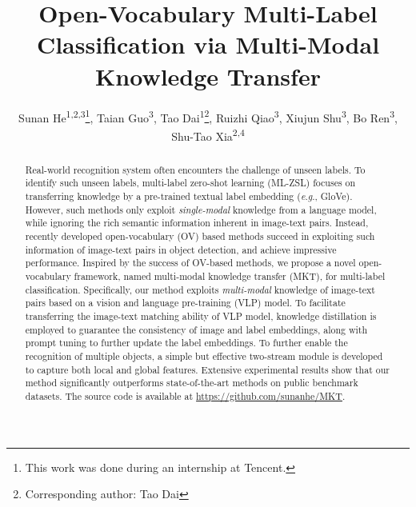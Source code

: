 \documentclass[letterpaper]{article} \usepackage{aaai23}  \usepackage{times}  \usepackage{helvet}  \usepackage{courier}  \usepackage[hyphens]{url}  \usepackage{graphicx} \urlstyle{rm} \def\UrlFont{\rm}  \usepackage{natbib}  \usepackage{caption} \frenchspacing  \setlength{\pdfpagewidth}{8.5in}  \setlength{\pdfpageheight}{11in}
\title{Open-Vocabulary Multi-Label Classification via Multi-Modal Knowledge Transfer}
\author{
Sunan He\textsuperscript{\rm 1,2,3}\equalcontrib\thanks{This work was done during an internship at Tencent.},
    Taian Guo\textsuperscript{\rm 3}\equalcontrib, 
    Tao Dai\textsuperscript{\rm 1}\thanks{Corresponding author: Tao Dai},
    Ruizhi Qiao\textsuperscript{\rm 3},
    Xiujun Shu\textsuperscript{\rm 3},
    Bo Ren\textsuperscript{\rm 3},
    Shu-Tao Xia\textsuperscript{\rm 2,4}
}
\newcommand{\eg}{\textit{e}.\textit{g}.}
\begin{document}
\maketitle

\begin{abstract}
Real-world recognition system often encounters the challenge of unseen labels.
To identify such unseen labels, multi-label zero-shot learning (ML-ZSL) focuses on transferring knowledge by a pre-trained textual label embedding (\eg, GloVe).
However, such methods only exploit \textit{single-modal} knowledge from a language model, while ignoring the rich semantic information inherent in image-text pairs.
Instead, recently developed open-vocabulary (OV) based methods  succeed in exploiting such information of image-text pairs  in  object detection, and achieve impressive performance.
Inspired by the success of OV-based methods, we propose a novel open-vocabulary framework, named multi-modal knowledge transfer (MKT), for  multi-label classification.
Specifically, our method exploits \textit{multi-modal} knowledge of image-text pairs  based on a vision and language pre-training (VLP) model.
To facilitate transferring the image-text matching ability of VLP model, knowledge distillation is employed to guarantee the consistency of image and label embeddings, along with prompt tuning to further update the label embeddings.
To further enable the recognition of multiple objects, a simple but effective two-stream module is developed to capture both local and global features.
Extensive experimental results show that our method significantly outperforms state-of-the-art methods on public benchmark datasets. 
The source code is available at \href{https://github.com/sunanhe/MKT}{https://github.com/sunanhe/MKT}.
\end{abstract}
\end{document}
